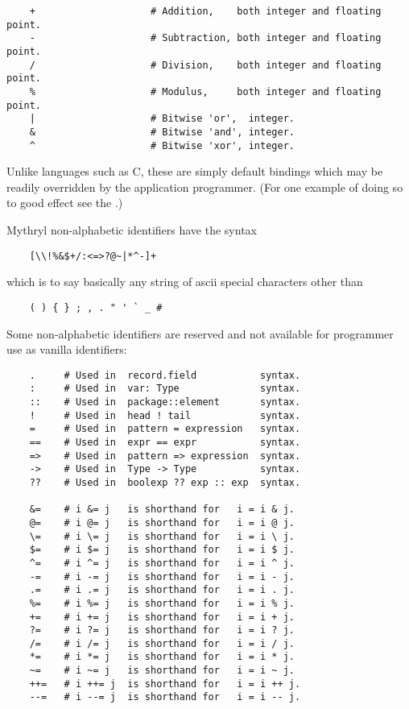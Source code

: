 \begin{verbatim}
    +                    # Addition,    both integer and floating point.
    -                    # Subtraction, both integer and floating point.
    /                    # Division,    both integer and floating point.
    %                    # Modulus,     both integer and floating point.
    |                    # Bitwise 'or',  integer.
    &                    # Bitwise 'and', integer.
    ^                    # Bitwise 'xor', integer.
\end{verbatim}

Unlike languages such as C, these are simply default bindings which 
may be readily overridden by the application programmer.  (For one 
example of doing so to good effect see the 
.)

Mythryl non-alphabetic identifiers have the syntax
\begin{verbatim}
    [\\!%&$+/:<=>?@~|*^-]+
\end{verbatim}
which is to say basically any string of ascii special 
characters other than 
\begin{verbatim}
    ( ) { } ; , . " ' ` _ #
\end{verbatim}

Some non-alphabetic identifiers are reserved and not available 
for programmer use as vanilla identifiers:
\begin{verbatim}
    .     # Used in  record.field           syntax.
    :     # Used in  var: Type              syntax.
    ::    # Used in  package::element       syntax.
    !     # Used in  head ! tail            syntax.
    =     # Used in  pattern = expression   syntax.
    ==    # Used in  expr == expr           syntax.
    =>    # Used in  pattern => expression  syntax.
    ->    # Used in  Type -> Type           syntax.
    ??    # Used in  boolexp ?? exp :: exp  syntax.

    &=    # i &= j   is shorthand for   i = i & j.
    @=    # i @= j   is shorthand for   i = i @ j.
    \=    # i \= j   is shorthand for   i = i \ j.
    $=    # i $= j   is shorthand for   i = i $ j.
    ^=    # i ^= j   is shorthand for   i = i ^ j.
    -=    # i -= j   is shorthand for   i = i - j.
    .=    # i .= j   is shorthand for   i = i . j.
    %=    # i %= j   is shorthand for   i = i % j.
    +=    # i += j   is shorthand for   i = i + j.
    ?=    # i ?= j   is shorthand for   i = i ? j.
    /=    # i /= j   is shorthand for   i = i / j.
    *=    # i *= j   is shorthand for   i = i * j.
    ~=    # i ~= j   is shorthand for   i = i ~ j.
    ++=   # i ++= j  is shorthand for   i = i ++ j.
    --=   # i --= j  is shorthand for   i = i -- j.
\end{verbatim}


